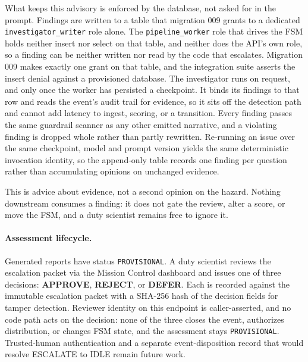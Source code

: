 \documentclass{article}
\begin{document}
What keeps this advisory is enforced by the database, not asked for in
the prompt.  Findings are written to a table that migration 009 grants to a
dedicated \texttt{investigator\_writer} role alone.  The
\texttt{pipeline\_worker} role that drives the FSM holds neither insert nor
select on that table, and neither does the API's own role, so a finding can be
neither written nor read by the code that escalates.  Migration 009 makes
exactly one grant on that table, and the integration suite asserts the
insert denial against a provisioned database.  The investigator runs on request, and only once the worker has
persisted a checkpoint. It binds its findings to that row and reads
the event's audit trail for evidence, so it sits off the detection
path and cannot add latency to ingest, scoring, or a transition. Every
finding passes the same guardrail scanner as any other emitted
narrative, and a violating finding is dropped whole rather than partly
rewritten.  Re-running an issue over the same
checkpoint, model and prompt version yields the same deterministic invocation
identity, so the append-only table records one finding per question rather
than accumulating opinions on unchanged evidence.

This is advice about evidence, not a second opinion on the hazard.  Nothing downstream consumes a finding: it does
not gate the review, alter a score, or move the FSM, and a duty scientist
remains free to ignore it.

\paragraph{Assessment lifecycle.}
Generated reports have status \texttt{PROVISIONAL}. A duty scientist
reviews the escalation packet via the Mission Control dashboard and
issues one of three decisions: \textbf{APPROVE}, \textbf{REJECT}, or
\textbf{DEFER}. Each is recorded against the immutable escalation
packet with a SHA-256 hash of the decision fields for tamper
detection. Reviewer identity on this endpoint is caller-asserted, and no code
path acts on the decision: none of the three closes the event,
authorizes distribution, or changes FSM state, and the assessment
stays \texttt{PROVISIONAL}.
Trusted-human authentication and a separate event-disposition record
that would resolve ESCALATE to IDLE remain future work.

\end{document}

